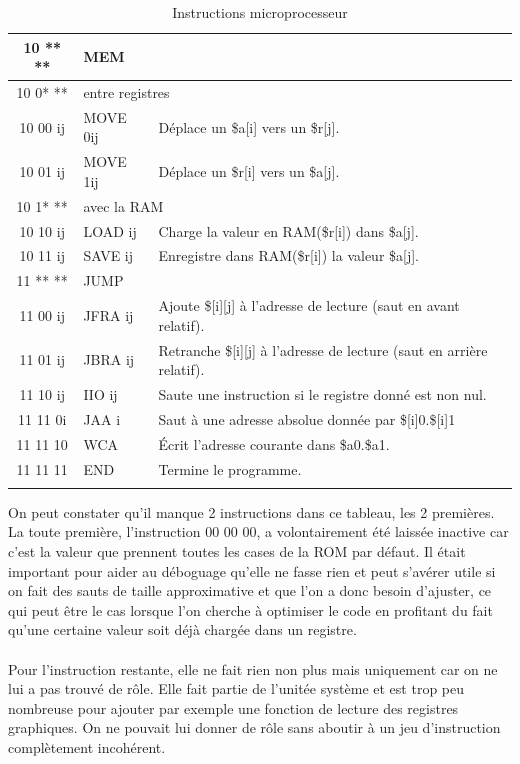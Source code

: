 \documentclass{article}
\begin{document}
\begin{savenotes}
\begin{longtable}{|c|l|l|}
  \hline\hline
  10 ** ** & \multicolumn{2}{|l|}{MEM} \\
  \hline
  10 0* ** & \multicolumn{2}{|l|}{entre registres} \\
  \hline
  10 00 ij & MOVE 0ij & Déplace un \$a[i] vers un \$r[j]. \\
  10 01 ij & MOVE 1ij & Déplace un \$r[i] vers un \$a[j]. \\
  \hline
  10 1* ** & \multicolumn{2}{|l|}{avec la RAM} \\
  \hline
  10 10 ij & LOAD ij  & Charge la valeur en RAM(\$r[i]) dans \$a[j]. \\
  10 11 ij & SAVE ij  & Enregistre dans RAM(\$r[i]) la valeur \$a[j]. \\

  \hline\hline
  11 ** ** & \multicolumn{2}{|l|}{JUMP} \\
  \hline
  11 00 ij & JFRA ij & Ajoute \$[i][j] à l'adresse de lecture (saut en avant relatif). \\
  11 01 ij & JBRA ij & Retranche \$[i][j] à l'adresse de lecture (saut en arrière relatif). \\
  11 10 ij & IIO  ij & Saute une instruction si le registre donné est non nul. \\
  11 11 0i & JAA  i  & Saut à une adresse absolue donnée par \$[i]0.\$[i]1\\
  11 11 10 & WCA     & \'Ecrit l'adresse courante dans \$a0.\$a1. \\
  11 11 11 & END      & Termine le programme. \\
  \hline

\caption{Instructions microprocesseur}
\end{longtable}
\end{savenotes}

On peut constater qu'il manque 2 instructions dans ce tableau, les 2 premières.
La toute première, l'instruction 00 00 00, a volontairement été laissée inactive
car c'est la valeur que prennent toutes les cases de la ROM par défaut. Il était
important pour aider au déboguage qu'elle ne fasse rien et peut s'avérer utile
si on fait des sauts de taille approximative et que l'on a donc besoin d'ajuster,
ce qui peut être le cas lorsque l'on cherche à optimiser le code en profitant du
fait qu'une certaine valeur soit déjà chargée dans un registre.

\paragraph{}Pour l'instruction restante, elle ne fait rien non plus mais uniquement car
on ne lui a pas trouvé de rôle. Elle fait partie de l'unitée système et est trop
peu nombreuse pour ajouter par exemple une fonction de lecture des registres graphiques.
On ne pouvait lui donner de rôle sans aboutir à un jeu d'instruction complètement incohérent.
\end{document}
